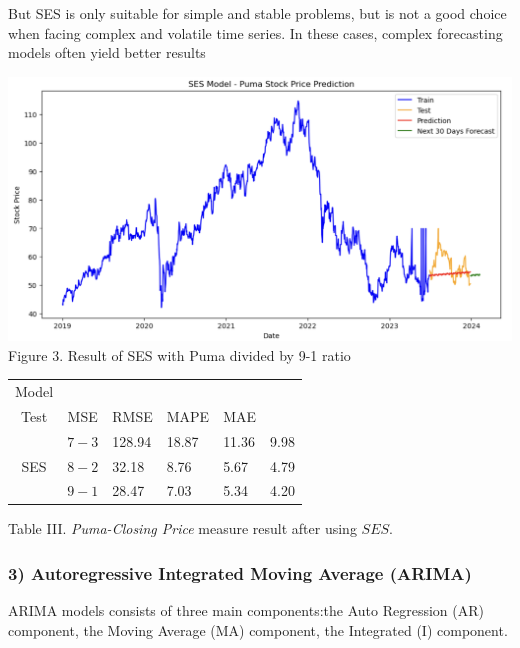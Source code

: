 \documentclass[conference]{IEEEtran}
\begin{document}
{But SES is only suitable for simple and stable problems, but is not a good choice when facing complex and volatile time series. In these cases, complex forecasting models often yield better results

\begin{H}
    \centering
    \includegraphics[max width= \linewidth]{SES(PUMA).png}
Figure 3. Result of SES with Puma divided by 9-1 ratio
    \label{fig:enter-label}
\end{H}

\begin{table}[H]
\centering
\begin{tabularx}{\columnwidth}{|c|c|X|X|X|X|}
\hline
Model & \begin{tabular}{c}
Train- \\
Test
\end{tabular} & MSE & RMSE & MAPE & MAE \\
\hline
\multirow{3}{*}{SES} & $7-3$ & 128.94 & 18.87 & 11.36 & 9.98 \\
\cline{2-6}
 & $8-2$ & 32.18 & 8.76 & 5.67 & 4.79 \\
\cline{2-6}
 & $9-1$ & 28.47 & 7.03 & 5.34 & 4.20 \\
\hline
\end{tabularx}
\end{table}
Table III. \textit{Puma-Closing Price} measure result after using $SES$.\\




\subsubsection*{\textbf{3) Autoregressive Integrated Moving Average (ARIMA)}}
ARIMA models consists of three main components:the Auto Regression (AR) component, the Moving Average (MA) component, the Integrated (I) component.

}
\end{document}
